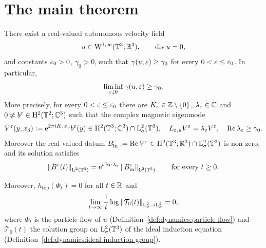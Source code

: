 \section{The main theorem}

\begin{theorem}
  \label{thm:main}
  \leanok
  There exist a real-valued autonomous velocity field
  \[
    u\in\mathrm{W}^{1,\infty}(\mathbb{T}^3;\mathbb{R}^3),\qquad\operatorname{div} u=0,
  \]
  and constants $\varepsilon_0>0$, $\gamma_0>0$, such that
  $\gamma(u,\varepsilon)\geq\gamma_0$ for every $0<\varepsilon\leq\varepsilon_0$.  In particular,
  \begin{equation}
    \liminf_{\varepsilon\downarrow0}\gamma(u,\varepsilon)\geq\gamma_0.
    \label{eq:main-growth-conclusion}
  \end{equation}
  More precisely, for every $0<\varepsilon\leq\varepsilon_0$ there are
  $K_\varepsilon\in\mathbb{Z}\setminus\{0\}$, $\lambda_\varepsilon\in\mathbb{C}$ and
  $0\neq b^\varepsilon\in\mathrm{H}^2(\mathbb{T}^2;\mathbb{C}^3)$ such that the complex magnetic eigenmode
  \begin{equation}
    V^\varepsilon(y,x_3):=\mathrm{e}^{2\pi iK_\varepsilon x_3}b^\varepsilon(y)
    \in\mathrm{H}^2(\mathbb{T}^3;\mathbb{C}^3)\cap\mathrm{L}^2_\sigma(\mathbb{T}^3),
    \quad
    L_{\varepsilon,u}V^\varepsilon=\lambda_\varepsilon V^\varepsilon,
    \quad
    \operatorname{Re}\lambda_\varepsilon\geq\gamma_0.
    \label{eq:main-spectral-conclusion}
  \end{equation}
  Moreover the real-valued datum
  $B_{\rm in}^\varepsilon:=\operatorname{Re} V^\varepsilon\in\mathrm{H}^2(\mathbb{T}^3;\mathbb{R}^3)\cap\mathrm{L}^2_\sigma(\mathbb{T}^3)$ is
  non-zero, and its solution satisfies
  \begin{equation}
    \left\|B^\varepsilon(t)\right\|_{\mathrm{L}^2(\mathbb{T}^3)}
    =\mathrm{e}^{t\operatorname{Re}\lambda_\varepsilon}\left\|B_{\rm in}^\varepsilon\right\|_{\mathrm{L}^2(\mathbb{T}^3)}
    \qquad\text{for every }t\geq0.
    \label{eq:main-thm-growth}
  \end{equation}

  Moreover, $h_{\mathrm{top}}(\Phi_t)=0$ for all $t\in\mathbb{R}$ and
  \[
    \lim_{t\to\infty}\frac1t
    \log\left\|\mathcal T_0(t)\right\|_{\mathrm{L}^2_\sigma\to\mathrm{L}^2_\sigma}=0,
  \]
  where $\Phi_t$ is the particle flow of $u$
  (Definition~\ref{def:dynamics:particle-flow}) and $\mathcal T_0(t)$ the solution
  group on $\mathrm{L}^2_\sigma(\mathbb{T}^3)$ of the ideal induction equation
  (Definition~\ref{def:dynamics:ideal-induction-group}).
\end{theorem}

